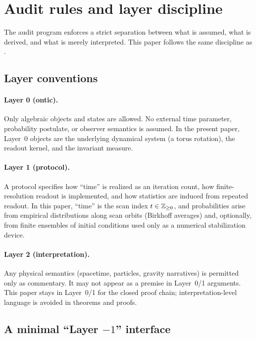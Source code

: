 
\section{Audit rules and layer discipline}
\label{sec:audit_layers}

The audit program enforces a strict separation between what is assumed, what is derived, and what is merely interpreted. This paper follows the same discipline as \cite{Ma2025HPA,Ma2025FoP,Ma2025STI}.

\subsection{Layer conventions}
\label{sec:layer_conventions}

\paragraph{Layer 0 (ontic).}
Only algebraic objects and states are allowed. No external time parameter, probability postulate, or observer semantics is assumed. In the present paper, Layer~0 objects are the underlying dynamical system (a torus rotation), the readout kernel, and the invariant measure.

\paragraph{Layer 1 (protocol).}
A protocol specifies how ``time'' is realized as an iteration count, how finite-resolution readout is implemented, and how statistics are induced from repeated readout. In this paper, ``time'' is the scan index $t\in\mathbb{Z}_{\ge 0}$, and probabilities arise from empirical distributions along scan orbits (Birkhoff averages) and, optionally, from finite ensembles of initial conditions used only as a numerical stabilization device.

\paragraph{Layer 2 (interpretation).}
Any physical semantics (spacetime, particles, gravity narratives) is permitted only as commentary. It may not appear as a premise in Layer~0/1 arguments. This paper stays in Layer~0/1 for the closed proof chain; interpretation-level language is avoided in theorems and proofs.

\subsection{A minimal ``Layer \texorpdfstring{$-1$}{-1}'' interface}
\label{sec:layer_minus_one}

